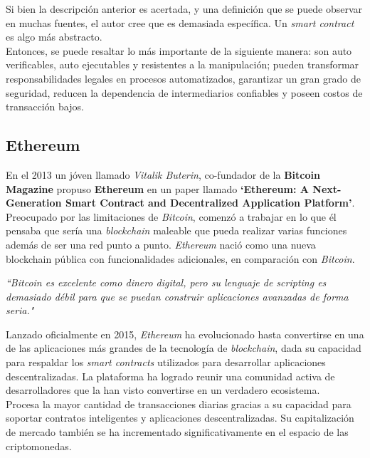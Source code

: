 Si bien la descripción anterior es acertada, y una definición que se puede observar en muchas fuentes, el autor cree que es demasiada específica. Un \textit{smart contract} es algo más abstracto.\\

Entonces, se puede resaltar lo más importante de la siguiente manera: son auto verificables, auto ejecutables y resistentes a la manipulación; pueden transformar responsabilidades legales en procesos automatizados, garantizar un gran grado de seguridad, reducen la dependencia de intermediarios confiables y poseen costos de transacción bajos. 


\subsection{Ethereum}
En el 2013 un jóven llamado \textit{Vitalik Buterin}\cite{miethereumvitalik}, co-fundador de la \textbf{Bitcoin Magazine} propuso \textbf{Ethereum} en un paper llamado \textbf{‘Ethereum: A Next-Generation Smart Contract and Decentralized Application Platform’}. Preocupado por las limitaciones de \textit{Bitcoin}, comenzó a trabajar en lo que él pensaba que sería una \textit{blockchain} maleable que pueda realizar varias funciones además de ser una red punto a punto. \textit{Ethereum}\cite{101blockchainseth} nació como una nueva blockchain pública con funcionalidades adicionales, en comparación con \textit{Bitcoin}.\\

\begin{displayquote}
\textit{``Bitcoin es excelente como dinero digital, pero su lenguaje de scripting es demasiado débil para que se puedan construir aplicaciones avanzadas de forma seria."}
\end{displayquote}

Lanzado oficialmente en 2015, \textit{Ethereum} ha evolucionado hasta convertirse en una de las aplicaciones más grandes de la tecnología de \textit{blockchain}, dada su capacidad para respaldar los \textit{smart contracts} utilizados para desarrollar aplicaciones descentralizadas. La plataforma ha logrado reunir una comunidad activa de desarrolladores que la han visto convertirse en un verdadero ecosistema.\\

Procesa la mayor cantidad de transacciones diarias gracias a su capacidad para soportar contratos inteligentes y aplicaciones descentralizadas. Su capitalización de mercado también se ha incrementado significativamente en el espacio de las criptomonedas.\\

